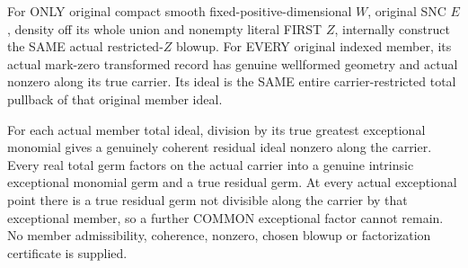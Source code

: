 \begin{theorem}
\label{hir:sharp-original-first-member-actual-total-exceptional-residual-geometry}
\leanok
For ONLY original compact smooth fixed-positive-dimensional $W$, original SNC
$E$, density off its whole union and nonempty literal FIRST $Z$, internally
construct the SAME actual restricted-$Z$ blowup. For EVERY original indexed
member, its actual mark-zero transformed record has genuine wellformed
geometry and actual nonzero along its true carrier. Its ideal is the SAME
entire carrier-restricted total pullback of that original member ideal.

For each actual member total ideal, division by its true greatest exceptional
monomial gives a genuinely coherent residual ideal nonzero along the carrier.
Every real total germ factors on the actual carrier into a genuine intrinsic
exceptional monomial germ and a true residual germ. At every actual exceptional
point there is a true residual germ not divisible along the carrier by that
exceptional member, so a further COMMON exceptional factor cannot remain.
No member admissibility, coherence, nonzero, chosen blowup or factorization
certificate is supplied.
\end{theorem}
